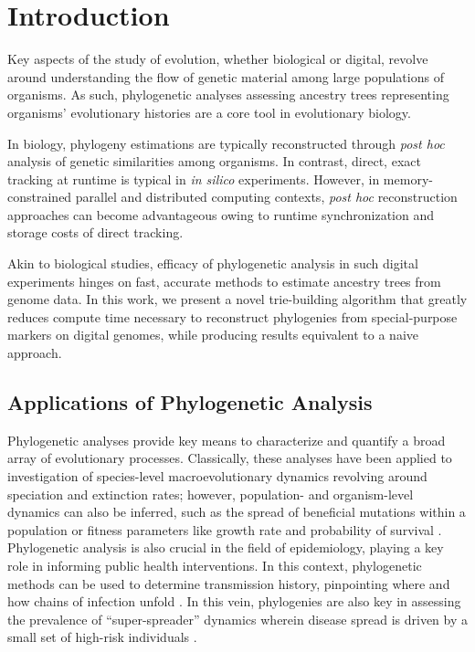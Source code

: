\section{Introduction} \label{sec:introduction}

Key aspects of the study of evolution, whether biological or digital, revolve around understanding the flow of genetic material among large populations of organisms.
As such, phylogenetic analyses assessing ancestry trees representing organisms' evolutionary histories are a core tool in evolutionary biology.

In biology, phylogeny estimations are typically reconstructed through \textit{post hoc} analysis of genetic similarities among organisms.
In contrast, direct, exact tracking at runtime is typical in \textit{in silico} experiments.
However, in memory-constrained parallel and distributed computing contexts, \textit{post hoc} reconstruction approaches can become advantageous owing to runtime synchronization and storage costs of direct tracking.

Akin to biological studies, efficacy of phylogenetic analysis in such digital experiments hinges on fast, accurate methods to estimate ancestry trees from genome data.
In this work, we present a novel trie-building algorithm that greatly reduces compute time necessary to reconstruct phylogenies from special-purpose markers on digital genomes, while producing results equivalent to a naive approach.

\subsection{Applications of Phylogenetic Analysis}

Phylogenetic analyses provide key means to characterize and quantify a broad array of evolutionary processes.
Classically, these analyses have been applied to investigation of species-level macroevolutionary dynamics revolving around speciation and extinction rates; however, population- and organism-level dynamics can also be inferred, such as the spread of beneficial mutations within a population or fitness parameters like growth rate and probability of survival \citep{genthon2023cell, levy2015quantitative, stadler2013recovering}.
Phylogenetic analysis is also crucial in the field of epidemiology, playing a key role in informing public health interventions.
In this context, phylogenetic methods can be used to determine transmission history, pinpointing where and how chains of infection unfold \citep{wang2020role}.
In this vein, phylogenies are also key in assessing the prevalence of  ``super-spreader'' dynamics wherein disease spread is driven by a small set of high-risk individuals \citep{colijn2014phylogenetic}.

